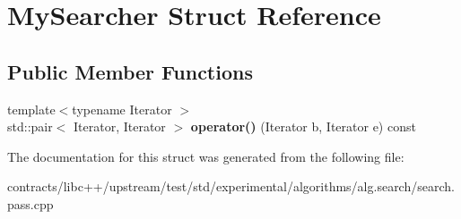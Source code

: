 \hypertarget{struct_my_searcher}{}\section{My\+Searcher Struct Reference}
\label{struct_my_searcher}
\subsection*{Public Member Functions}
\begin{DoxyCompactItemize}
\item 
\mbox{\label{struct_my_searcher_a0447e795e1ebedc92eb16be9658f04e4}} 
{\footnotesize template$<$typename Iterator $>$ }\\std\+::pair$<$ Iterator, Iterator $>$ {\bfseries operator()} (Iterator b, Iterator e) const
\end{DoxyCompactItemize}


The documentation for this struct was generated from the following file\+:\begin{DoxyCompactItemize}
\item 
contracts/libc++/upstream/test/std/experimental/algorithms/alg.\+search/search.\+pass.\+cpp\end{DoxyCompactItemize}
